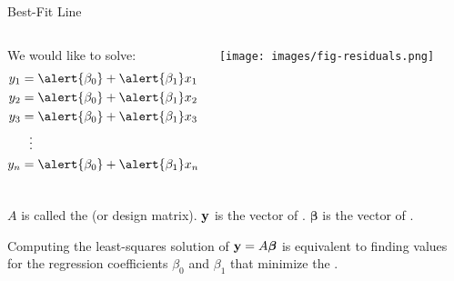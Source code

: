 \documentclass[xcolor=dvipsnames,aspectratio=169,t]{beamer}
\begin{document}
\begin{frame}{Best-Fit Line}
  \begin{columns}[T]
  \column{0.33\tw}
  We would like to solve:
  \begin{align*}
  y_1 &= \alert{\beta_0} + \alert{\beta_1} x_1 \\
  y_2 &= \alert{\beta_0} + \alert{\beta_1} x_2 \\
  y_3 &= \alert{\beta_0} + \alert{\beta_1} x_3 \\
      & \ \ \vdots  \\
  y_n &= \alert{\beta_0} + \alert{\beta_1} x_n \\ 
  \end{align*}

  \column{0.33\tw}
  
  \column{0.33\tw}
  \begin{center}
  \texttt{[image: images/fig-residuals.png]}
  \end{center}
  \end{columns}
  \vspace*{-1em}
  
  \pause\pause
  \bi
  \ii $A$ is called the  (or design matrix).
  \ii $\mathbf{y}$ is the vector of .
  \ii $\boldsymbol\beta$ is the vector of .
  \ei
  \medskip

  Computing the \alert{least-squares} solution of $\mathbf{y} = A \boldsymbol\beta$ is equivalent to finding
  values for the regression coefficients $\beta_0$ and $\beta_1$ that minimize the .
\end{frame}
\end{document}
